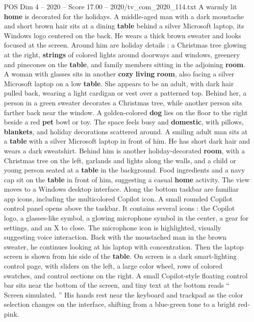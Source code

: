 \begin{textsample}{POS Dim 4 – 2020 – Score 17.00 – 2020/tv\_com\_2020\_114.txt}  \label{ex:f4_pos_011}
A warmly lit \textbf{home} is decorated for the holidays.
A middle-aged man with a dark moustache and short brown hair sits at a dining \textbf{table} behind a silver Microsoft laptop, its Windows logo centered on the back.
He wears a thick brown sweater and looks focused at the screen.
Around him are holiday details : a Christmas tree glowing at the right, \textbf{strings} of colored lights around doorways and windows, greenery and pinecones on the \textbf{table}, and family members sitting in the adjoining \textbf{room}.
A woman with glasses sits in another \textbf{cozy} \textbf{living} \textbf{room}, also facing a silver Microsoft laptop on a low \textbf{table}.
She appears to be an adult, with dark hair pulled back, wearing a light cardigan or vest over a patterned top.
Behind her, a person in a green sweater decorates a Christmas tree, while another person sits farther back near the window.
A golden-colored \textbf{dog} lies on the floor to the right beside a red \textbf{pet} bowl or toy.
The space feels busy and \textbf{domestic}, with pillows, \textbf{blankets}, and holiday decorations scattered around.
A smiling adult man sits at a \textbf{table} with a silver Microsoft laptop in front of him.
He has short dark hair and wears a dark sweatshirt.
Behind him is another holiday-decorated \textbf{room}, with a Christmas tree on the left, garlands and lights along the walls, and a child or young person seated at a \textbf{table} in the background.
Food ingredients and a navy cap sit on the \textbf{table} in front of him, suggesting a casual \textbf{home} activity.
The view moves to a Windows desktop interface.
Along the bottom taskbar are familiar app icons, including the multicolored Copilot icon.
A small rounded Copilot control panel opens above the taskbar.
It contains several icons : the Copilot logo, a glasses-like symbol, a glowing microphone symbol in the center, a gear for settings, and an X to close.
The microphone icon is highlighted, visually suggesting voice interaction.
Back with the moustached man in the brown sweater, he continues looking at his laptop with concentration.
Then the laptop screen is shown from his side of the \textbf{table}.
On screen is a dark smart-lighting control page, with sliders on the left, a large color wheel, rows of colored swatches, and control sections on the right.
A small Copilot-style floating control bar sits near the bottom of the screen, and tiny text at the bottom reads “ Screen simulated. ” His hands rest near the keyboard and trackpad as the color selection changes on the interface, shifting from a blue-green tone to a bright red-pink.

\end{textsample}
